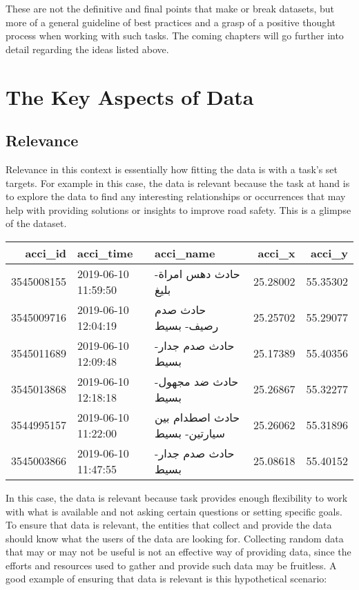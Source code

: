 \documentclass[
]{book}
\begin{document}
These are not the definitive and final points that make or break datasets, but more of a general guideline of best practices and a grasp of a positive thought process when working with such tasks. The coming chapters will go further into detail regarding the ideas listed above.

\hypertarget{the-key-aspects-of-data}{%
\chapter{The Key Aspects of Data}\label{the-key-aspects-of-data}}

\hypertarget{relevance}{%
\section{Relevance}\label{relevance}}

Relevance in this context is essentially how fitting the data is with a task's set targets. For example in this case, the data is relevant because the task at hand is to explore the data to find any interesting relationships or occurrences that may help with providing solutions or insights to improve road safety. This is a glimpse of the dataset.

\begin{tabular}{r|l|l|r|r}
\hline
acci\_id & acci\_time & acci\_name & acci\_x & acci\_y\\
\hline
3545008155 & 2019-06-10 11:59:50 & حادث دهس امراة- بليغ & 25.28002 & 55.35302\\
\hline
3545009716 & 2019-06-10 12:04:19 & حادث صدم رصيف- بسيط & 25.25702 & 55.29077\\
\hline
3545011689 & 2019-06-10 12:09:48 & حادث صدم جدار- بسيط & 25.17389 & 55.40356\\
\hline
3545013868 & 2019-06-10 12:18:18 & حادث ضد مجهول- بسيط & 25.26867 & 55.32277\\
\hline
3544995157 & 2019-06-10 11:22:00 & حادث اصطدام بين سيارتين- بسيط & 25.26062 & 55.31896\\
\hline
3545003866 & 2019-06-10 11:47:55 & حادث صدم جدار- بسيط & 25.08618 & 55.40152\\
\hline
\end{tabular}

In this case, the data is relevant because task provides enough flexibility to work with what is available and not asking certain questions or setting specific goals. To ensure that data is relevant, the entities that collect and provide the data should know what the users of the data are looking for. Collecting random data that may or may not be useful is not an effective way of providing data, since the efforts and resources used to gather and provide such data may be fruitless. A good example of ensuring that data is relevant is this hypothetical scenario:
\end{document}
